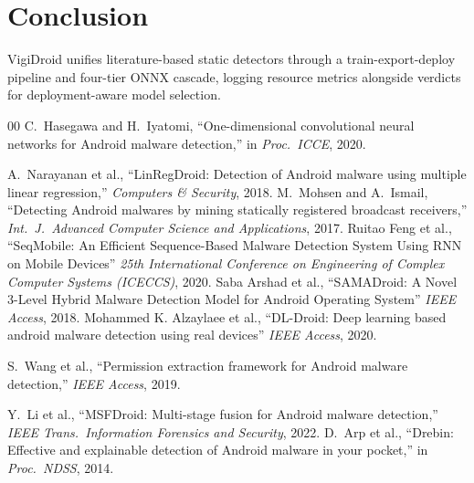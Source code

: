 \documentclass[conference]{IEEEtran}
\begin{document}
	\section{Conclusion}
	VigiDroid unifies literature-based static detectors through a train-export-deploy pipeline and four-tier ONNX cascade, logging resource metrics alongside verdicts for deployment-aware model selection.
	\balance
	\footnotesize
	\begin{thebibliography}{00}
		C.~Hasegawa and H.~Iyatomi,
		``One-dimensional convolutional neural networks for Android malware detection,''
		in \textit{Proc.\ ICCE}, 2020.
		
		A.~Narayanan et al.,
		``LinRegDroid: Detection of Android malware using multiple linear regression,''
		\textit{Computers \& Security}, 2018.
		M.~Mohsen and A.~Ismail,
		``Detecting Android malwares by mining statically registered broadcast receivers,''
		\textit{Int.\ J.\ Advanced Computer Science and Applications}, 2017.
		Ruitao Feng et al.,
		``SeqMobile: An Efficient Sequence-Based Malware Detection System Using RNN on Mobile Devices''
		\textit{ 25th International Conference on Engineering of Complex Computer Systems (ICECCS)}, 2020.
		Saba Arshad et al.,
		``SAMADroid: A Novel 3-Level Hybrid Malware Detection Model for Android Operating System''
		\textit{IEEE Access}, 2018.
		Mohammed K. Alzaylaee et al.,
		``DL-Droid: Deep learning based android malware detection using real devices''
		\textit{IEEE Access}, 2020.
		
		S.~Wang et al.,
		``Permission extraction framework for Android malware detection,''
		\textit{IEEE Access}, 2019.
		
		Y.~Li et al.,
		``MSFDroid: Multi-stage fusion for Android malware detection,''
		\textit{IEEE Trans.\ Information Forensics and Security}, 2022.
		D.~Arp et al.,
		``Drebin: Effective and explainable detection of Android malware in your pocket,''
		in \textit{Proc.\ NDSS}, 2014.
		
	\end{thebibliography}
	
\end{document}
